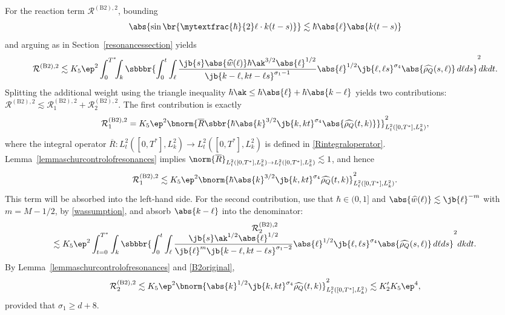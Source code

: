 For the reaction term $\mathcal{R}^{\mathrm{(B2),2}}$, bounding
\begin{align*}
\abs{\sin\br{\mytextfrac{\hbar}{2}\ell\cdot k(t-s)}}\lesssim\hbar\abs{\ell}\abs{k(t-s)}
\end{align*}
and arguing as in Section~\ref{resonancessection} yields
\begin{align*}
\mathcal{R}^{\mathrm{(B2),2}}\lesssim K_5\ep^2\int_{0}^{T^*}\hspace{-0.15cm}\int_k\sbbbr{\int_0^t\int_\ell\frac{\jb{s}\abs{\widehat w(\ell)}\hbar\ak^{3/2} \abs{\ell}^{1/2}}{\jb{k-\ell,kt-\ell s}^{\sigma_1-1}}\abs{\ell}^{1/2}\jb{\ell,\ell s}^{\sigma_4}\abs{\widehat{\rho_Q}(s,\ell)}\,d\ell ds}^2\hspace{-0.1cm}dkdt.
\end{align*}
Splitting the additional weight using the triangle inequality $\hbar\ak \leq \hbar\abs{\ell} + \hbar\abs{k - \ell}$ yields two contributions: $\mathcal{R}^{\mathrm{(B2),2}}\lesssim\mathcal{R}^{\mathrm{(B2),2}}_1+\mathcal{R}^{\mathrm{(B2),2}}_2$. The first contribution is exactly
\begin{align*}
\mathcal{R}^{\mathrm{(B2),2}}_1=K_5\ep^2\bnorm{\overline{R}\sbbr{\hbar\abs{k}^{3/2}\jb{k,kt}^{\sigma_4}\abs{\widehat{\rho_Q}(t,k)}}}_{L^2_{t}([0,T^*],L^2_k)}^2,
\end{align*}
where the integral operator $\overline R\colon L^2_{t}([0,T^*],L^2_k)\to L^2_{t}([0,T^*],L^2_k)$ is defined in \eqref{Rintegraloperator}. Lemma~\ref{lemmaschurcontrolofresonances} implies $\norm{\overline R}_{L^2_{t}([0,T^*],L^2_k)\to L^2_{t}([0,T^*],L^2_k)}\lesssim1$, and hence
\begin{align*}
\mathcal{R}^{\mathrm{(B2),2}}_1\lesssim K_5\ep^2\bnorm{\hbar\abs{k}^{3/2}\jb{k,kt}^{\sigma_4}\widehat{\rho_Q}(t,k)}_{L^2_{t}([0,T^*],L^2_k)}^2.
\end{align*} This term will be absorbed into the left-hand side. For the second contribution, use that $\hbar\in (0,1]$ and $\abs{\widehat w(\ell)}\lesssim\jb{\ell}^{-m}$ with $m=M-1/2$, by \eqref{wassumption}, and absorb $\abs{k-\ell}$ into the denominator:
\begin{multline*}
\mathcal{R}^{\mathrm{(B2),2}}_2\\[-8pt]
\lesssim K_5\ep^2\int_{t=0}^{T^*}\int_k\sbbbr{\int_0^t\int_\ell\frac{\jb{s}\ak^{1/2} \abs{\ell}^{1/2}}{\jb{\ell}^m\jb{k-\ell,kt-\ell s}^{\sigma_1-2}}\abs{\ell}^{1/2}\jb{\ell,\ell s}^{\sigma_4}\abs{\widehat{\rho_Q}(s,\ell)}\,d\ell ds}^2dkdt.
\end{multline*}
By Lemma~\ref{lemmaschurcontrolofresonances} and \eqref{B2original},
\begin{align*}
\mathcal{R}^{\mathrm{(B2),2}}_2\lesssim K_5\ep^2\bnorm{\abs{k}^{{1/2}}\jb{k,kt}^{\sigma_4}\widehat{\rho_Q}(t,k)}_{L^2_{t}([0,T^*],L^2_k)}^2\lesssim K_2'K_5\ep^4,
\end{align*}provided that $\sigma_1\geq d+8$.

